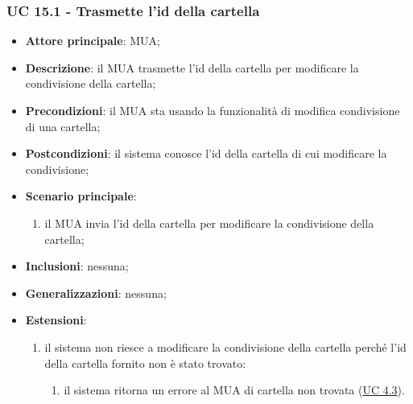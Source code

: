     \subsubsection{UC 15.1 - Trasmette l'id della cartella} \label{sec:UC15.1}
    \begin{itemize}
        \item \textbf{Attore principale}: MUA;
        \item \textbf{Descrizione}: il MUA trasmette l'id della cartella per modificare la condivisione della cartella;
        \item \textbf{Precondizioni}: il MUA sta usando la funzionalità di modifica condivisione di una cartella;
        \item \textbf{Postcondizioni}: il sistema conosce l'id della cartella di cui modificare la condivisione;
        \item \textbf{Scenario principale}:
            \begin{enumerate}
                \item il MUA invia l'id della cartella per modificare la condivisione della cartella;
            \end{enumerate}
        \item \textbf{Inclusioni}: nessuna;
        \item \textbf{Generalizzazioni}: nessuna;
        \item \textbf{Estensioni}:
            \begin{enumerate}[label=\alph*.]
                \item il sistema non riesce a modificare la condivisione della cartella perché l'id della cartella fornito non è stato trovato:
                \begin{enumerate}[label=\arabic*.]
                    \item il sistema ritorna un errore al MUA di cartella non trovata (\hyperref[sec:UC4.3]{UC 4.3}).
                \end{enumerate}
            \end{enumerate}
    \end{itemize}


